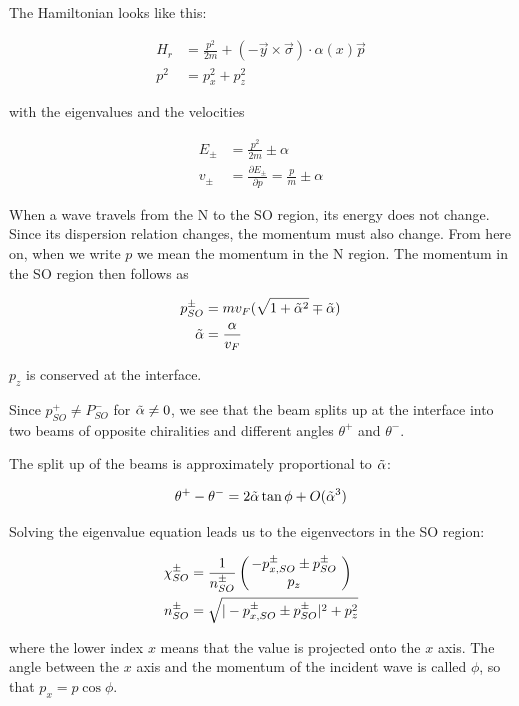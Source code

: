 The Hamiltonian looks like this:

\begin{align}
    H_r &= \frac{p^2}{2m} + (-\vec y \times \vec \sigma) \cdot
            \alpha(x) \vec p\\ 
    p^2 &= p_x^2 + p_z^2
\end{align}

with the eigenvalues and the velocities

\begin{align}
    E_{\pm} &= \frac{p^2}{2m} \pm \alpha \\
    v_{\pm} &= \frac{\partial E_{\pm}}{\partial p} = \frac{p}{m} \pm \alpha
\end{align}

When a wave travels from the N to the SO region, its energy does not
change. Since its dispersion relation changes, the momentum must also
change. From here on, when we write $p$ we mean the momentum in the N
region. The momentum in the SO region then follows as

\begin{align}
    \label{eq:pso}
    p_{SO}^{\pm} &= m v_F (\sqrt{1 + \tilde \alpha^2} \mp \tilde \alpha) \\
    \tilde\alpha &= \frac{\alpha}{v_F}
\end{align}

$p_z$ is conserved at the interface.

Since $p_{SO}^+ \not = P_{SO}^-$ for $\tilde \alpha \not = 0$, we see that
the beam splits up at the interface into two beams of opposite
chiralities and different angles $\theta^+$ and $\theta^-$.

The split up of the beams is approximately proportional to $\tilde \alpha$:

\begin{align}
    \theta^+ - \theta^- = 2 \tilde \alpha \tan \phi + O(\tilde \alpha^3)
\end{align}

Solving the eigenvalue equation leads us to the eigenvectors in the SO
region:

\begin{align}
   \chi_{SO}^{\pm} &= \frac{1}{n_{SO}^{\pm}} 
                      \left(\hspace{-.8ex}\begin{array}{c}-p_{x,SO}^{\pm} \pm p_{SO}^\pm\\p_z\end{array}\hspace{-.4ex}\right) \\
    n_{SO}^{\pm}   &= \sqrt{|-p_{x,SO}^{\pm} \pm p_{SO}^\pm|^2 +
        p_z^2}
    \label{eq:chi-so-pm}
\end{align}

where the lower index $x$ means that the value is projected onto the
$x$ axis. The angle between the $x$ axis and the momentum of the
incident wave is called $\phi$, so that $p_x = p \cos \phi$.

